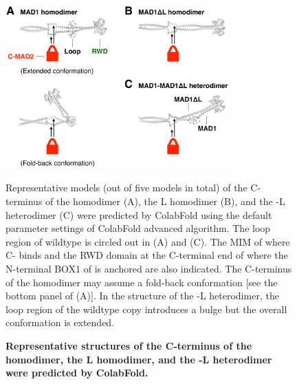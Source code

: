 \begin{figure}
    \centering
    \includegraphics[width=0.77\textwidth]{chapters/figures/ColabFoldPrediction.pdf}
    \caption{\textbf{Representative structures of the C-terminus of the  homodimer, the \textDelta{}L homodimer, and the -\textDelta{}L heterodimer were predicted by ColabFold.}}
    \noindent\justifying Representative models (out of five models in total) of the C-terminus of the  homodimer (A), the \textDelta{}L homodimer (B), and the -\textDelta{}L heterodimer (C) were predicted by ColabFold using the default parameter settings of ColabFold advanced algorithm. The loop region of wildtype  is circled out in (A) and (C). The MIM of  where C- binds and the RWD domain at the C-terminal end of  where the N-terminal BOX1 of  is anchored are also indicated. The C-terminus of the  homodimer may assume a fold-back conformation [see the bottom panel of (A)]. In the structure of the -\textDelta{}L heterodimer, the loop region of the wildtype copy introduces a bulge but the overall conformation is extended. 
    \label{ColabFoldPrediction}
\end{figure}

